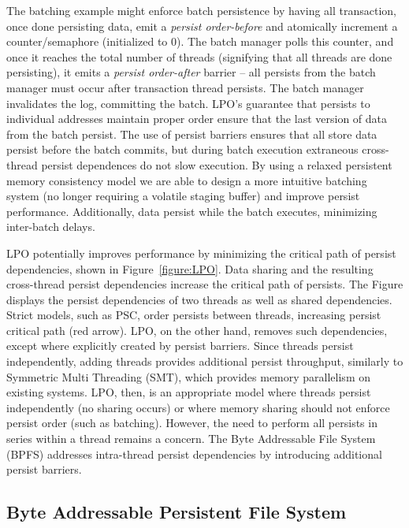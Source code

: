 The batching example might enforce batch persistence by having all transaction, once done persisting data, emit a \emph{persist order-before} and atomically increment a counter/semaphore (initialized to 0).
The batch manager polls this counter, and once it reaches the total number of threads (signifying that all threads are done persisting), it emits a \emph{persist order-after} barrier -- all persists from the batch manager must occur after transaction thread persists.
The batch manager invalidates the log, committing the batch.
LPO's guarantee that persists to individual addresses maintain proper order ensure that the last version of data from the batch persist.
The use of persist barriers ensures that all store data persist before the batch commits, but during batch execution extraneous cross-thread persist dependences do not slow execution.
By using a relaxed persistent memory consistency model we are able to design a more intuitive batching system (no longer requiring a volatile staging buffer) and improve persist performance.
Additionally, data persist while the batch executes, minimizing inter-batch delays.


LPO potentially improves performance by minimizing the critical path of persist dependencies, shown in Figure~\ref{figure:LPO}.
Data sharing and the resulting cross-thread persist dependencies increase the critical path of persists.
The Figure displays the persist dependencies of two threads as well as shared dependencies.
Strict models, such as PSC, order persists between threads, increasing persist critical path (red arrow).
LPO, on the other hand, removes such dependencies, except where explicitly created by persist barriers.
Since threads persist independently, adding threads provides additional persist throughput, similarly to Symmetric Multi Threading (SMT), which provides memory parallelism on existing systems.
LPO, then, is an appropriate model where threads persist independently (no sharing occurs) or where memory sharing should not enforce persist order (such as batching).
However, the need to perform all persists in series within a thread remains a concern.
The Byte Addressable File System (BPFS) addresses intra-thread persist dependencies by introducing additional persist barriers.

\subsection{Byte Addressable Persistent File System}
\label{sec:PMC:PersistenceModels:BPFS}

